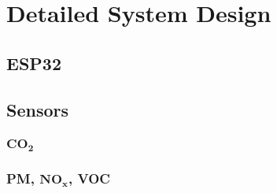 \chapter{Detailed System Design}
\section{ESP32}

\section{Sensors}
\subsection{$\mathbf{CO_2}$}
\subsection{PM, $\mathbf{NO_x}$, VOC}
